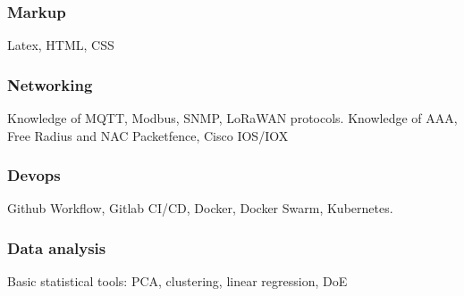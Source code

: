 \documentclass[11pt,a4paper]{article}
\begin{document}
  \subsubsection{Markup}
  Latex, HTML, CSS

  \subsubsection{Networking}
  Knowledge of MQTT, Modbus, SNMP, LoRaWAN protocols. Knowledge of AAA, Free Radius and NAC Packetfence, Cisco IOS/IOX

  \subsubsection{Devops}
  Github Workflow, Gitlab CI/CD, Docker, Docker Swarm, Kubernetes.

  \subsubsection{Data analysis}
  Basic statistical tools: PCA, clustering, linear regression, DoE
\end{document}
